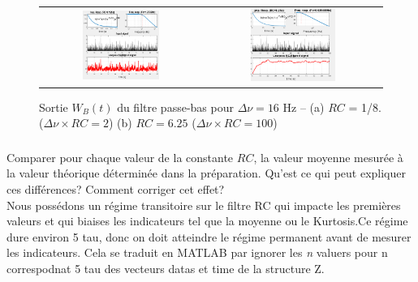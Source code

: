 \documentclass{article}
\begin{document}
\begin{figure}[h]
\begin{tabular}{cc}
\includegraphics[width=0.5\textwidth]{images/rc_1.PNG} & \includegraphics[width=0.5\textwidth]{images/rc_3.png} \\
\end{tabular}
 \caption{Sortie $W_B(t)$ du filtre passe-bas pour $\Delta\nu = 16$ Hz -- 
  (a) $RC$ = 1/8. ($\Delta\nu\times RC=2 $) (b) $RC = 6.25 $ ($\Delta\nu\times RC = 100 $) }
 \label{fig-Wb}
\end{figure}

\subsubsection{}

Comparer pour chaque valeur de la constante $RC$, la valeur moyenne mesurée à la valeur théorique déterminée dans la préparation. Qu'est ce qui peut expliquer ces différences? Comment corriger cet effet?  \\
\newline
Nous possédons un régime transitoire sur le filtre RC qui impacte les premières valeurs et qui biaises les indicateurs tel que la moyenne ou le Kurtosis.Ce régime dure environ 5 tau, donc on doit atteindre le régime permanent avant de mesurer les indicateurs. Cela se traduit en MATLAB  par ignorer les \textit{n} valuers pour n correspodnat 5 tau des vecteurs datas et time de la structure Z.
\end{document}
